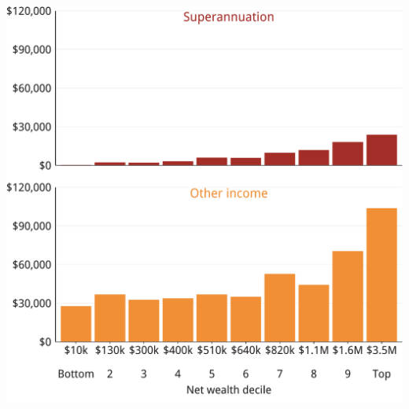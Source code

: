 \documentclass[tikz]{standalone}\usepackage[]{graphicx}\usepackage[]{color}
\newenvironment{knitrout}{}{} %
\begin{document}
\begin{knitrout}
\color{fgcolor}
\includegraphics[width=11.55in,height=11.55in]{./Super-tax-targeting/b5-super-atlas/Figure3-3-1} 

\end{knitrout}
\end{document}
